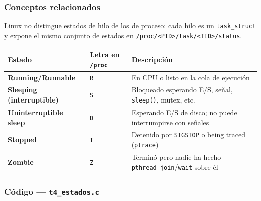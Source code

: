 \documentclass[
  spanish,
]{article}
\newcounter{none} %
\begin{document}
\subsubsection{Conceptos relacionados}\label{conceptos-relacionados-3}

Linux no distingue estados de hilo de los de proceso: cada hilo es un
\texttt{task\_struct} y expone el mismo conjunto de estados en
\texttt{/proc/\textless{}PID\textgreater{}/task/\textless{}TID\textgreater{}/status}.

{\def\LTcaptype{none} %
\begin{longtable}[]{@{}
  >{\raggedright\arraybackslash}p{}
  >{\raggedright\arraybackslash}p{}
  >{\raggedright\arraybackslash}p{}@{}}
\toprule\noalign{}
\begin{minipage}[b]{\linewidth}\raggedright
Estado
\end{minipage} & \begin{minipage}[b]{\linewidth}\raggedright
Letra en \texttt{/proc}
\end{minipage} & \begin{minipage}[b]{\linewidth}\raggedright
Descripción
\end{minipage} \\
\midrule\noalign{}
\endhead
\bottomrule\noalign{}
\endlastfoot
\textbf{Running/Runnable} & \texttt{R} & En CPU o listo en la cola de
ejecución \\
\textbf{Sleeping (interruptible)} & \texttt{S} & Bloqueado esperando
E/S, señal, \texttt{sleep()}, mutex, etc. \\
\textbf{Uninterruptible sleep} & \texttt{D} & Esperando E/S de disco; no
puede interrumpirse con señales \\
\textbf{Stopped} & \texttt{T} & Detenido por \texttt{SIGSTOP} o being
traced (\texttt{ptrace}) \\
\textbf{Zombie} & \texttt{Z} & Terminó pero nadie ha hecho
\texttt{pthread\_join}/\texttt{wait} sobre él \\
\end{longtable}
}

\subsubsection{\texorpdfstring{Código ---
\texttt{t4\_estados.c}}{Código --- t4\_estados.c}}\label{cuxf3digo-t4_estados.c}
\end{document}
